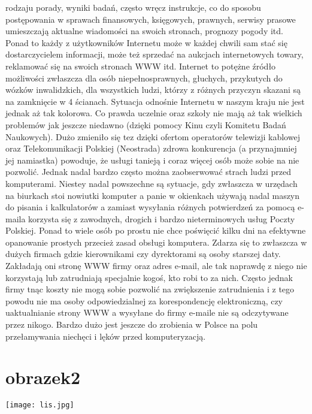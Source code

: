 \documentclass{article}
\begin{document}
rodzaju porady, wyniki badań, często wręcz instrukcje, co do sposobu postępowania w sprawach finansowych, księgowych, prawnych, serwisy prasowe umieszczają aktualne wiadomości na swoich stronach, prognozy pogody itd. Ponad to każdy z użytkowników Internetu może w każdej chwili sam stać się dostarczycielem informacji, może też sprzedać na aukcjach internetowych towary, reklamować się na swoich stronach WWW itd. Internet to potężne źródło możliwości zwłaszcza dla osób niepełnosprawnych, głuchych, przykutych do wózków inwalidzkich, dla wszystkich ludzi, którzy z różnych przyczyn skazani są na zamknięcie w 4 ścianach.
Sytuacja odnośnie Internetu w naszym kraju nie jest jednak aż tak kolorowa. Co prawda uczelnie oraz szkoły nie mają aż tak wielkich problemów jak jeszcze niedawno (dzięki pomocy Kinu czyli Komitetu Badań Naukowych). Dużo zmieniło się tez dzięki ofertom operatorów telewizji kablowej oraz Telekomunikacji Polskiej (Neostrada) zdrowa konkurencja (a przynajmniej jej namiastka) powoduje, że usługi tanieją i coraz więcej osób może sobie na nie pozwolić. Jednak nadal bardzo często można zaobserwować strach ludzi przed komputerami. Niestey nadal powszechne są sytuacje, gdy zwłaszcza w urzędach na biurkach stoi nowiutki komputer a panie w okienkach używają nadal maszyn do pisania i kalkulatorów a zamiast wysyłania różnych potwierdzeń za pomocą e-maila korzysta się z zawodnych, drogich i bardzo nieterminowych usług Poczty Polskiej. Ponad to wiele osób po prostu nie chce poświęcić kilku dni na efektywne opanowanie prostych przecież zasad obsługi komputera. Zdarza się to zwłaszcza w dużych firmach gdzie kierownikami czy dyrektorami są osoby starszej daty. Zakładają oni stronę WWW firmy oraz adres e-mail, ale tak naprawdę z niego nie korzystają lub zatrudniają specjalnie kogoś, kto robi to za nich. Często jednak firmy tnąc koszty nie mogą sobie pozwolić na zwiększenie zatrudnienia i z tego powodu nie ma osoby odpowiedzialnej za korespondencję elektroniczną, czy uaktualnianie strony WWW a wysyłane do firmy e-maile nie są odczytywane przez nikogo. Bardzo dużo jest jeszcze do zrobienia w Polsce na polu przełamywania niechęci i lęków przed komputeryzacją.









\newpage
\section {obrazek2}
\texttt{[image: lis.jpg]} \label{lis}
\end{document}
